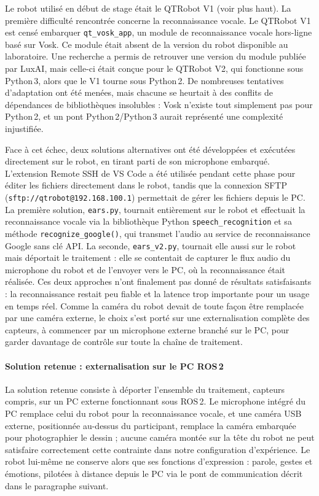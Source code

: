 \documentclass[11pt]{article}
\begin{document}
Le robot utilisé en début de stage était le QTRobot V1 (voir plus haut). La première difficulté rencontrée concerne la reconnaissance vocale. Le QTRobot V1 est censé embarquer \texttt{qt\_vosk\_app}, un module de reconnaissance vocale hors-ligne basé sur Vosk. Ce module était absent de la version du robot disponible au laboratoire. Une recherche a permis de retrouver une version du module publiée par LuxAI, mais celle-ci était conçue pour le QTRobot V2, qui fonctionne sous Python\,3, alors que le V1 tourne sous Python\,2. De nombreuses tentatives d'adaptation ont été menées, mais chacune se heurtait à des conflits de dépendances de bibliothèques insolubles : Vosk n'existe tout simplement pas pour Python\,2, et un pont Python\,2/Python\,3 aurait représenté une complexité injustifiée.

Face à cet échec, deux solutions alternatives ont été développées et exécutées directement sur le robot, en tirant parti de son microphone embarqué. L'extension Remote SSH de VS Code a été utilisée pendant cette phase pour éditer les fichiers directement dans le robot, tandis que la connexion SFTP (\texttt{sftp://qtrobot@192.168.100.1}) permettait de gérer les fichiers depuis le PC. La première solution, \texttt{ears.py}, tournait entièrement sur le robot et effectuait la reconnaissance vocale via la bibliothèque Python \texttt{speech\_recognition} et sa méthode \texttt{recognize\_google()}, qui transmet l'audio au service de reconnaissance Google sans clé API. La seconde, \texttt{ears\_v2.py}, tournait elle aussi sur le robot mais déportait le traitement : elle se contentait de capturer le flux audio du microphone du robot et de l'envoyer vers le PC, où la reconnaissance était réalisée. Ces deux approches n'ont finalement pas donné de résultats satisfaisants : la reconnaissance restait peu fiable et la latence trop importante pour un usage en temps réel. Comme la caméra du robot devait de toute façon être remplacée par une caméra externe, le choix s'est porté sur une externalisation complète des capteurs, à commencer par un microphone externe branché sur le PC, pour garder davantage de contrôle sur toute la chaîne de traitement.

\paragraph{Solution retenue : externalisation sur le PC ROS\,2}

La solution retenue consiste à déporter l'ensemble du traitement, capteurs compris, sur un PC externe fonctionnant sous ROS\,2. Le microphone intégré du PC remplace celui du robot pour la reconnaissance vocale, et une caméra USB externe, positionnée au-dessus du participant, remplace la caméra embarquée pour photographier le dessin ; aucune caméra montée sur la tête du robot ne peut satisfaire correctement cette contrainte dans notre configuration d'expérience. Le robot lui-même ne conserve alors que ses fonctions d'expression : parole, gestes et émotions, pilotées à distance depuis le PC via le pont de communication décrit dans le paragraphe suivant.
\end{document}
